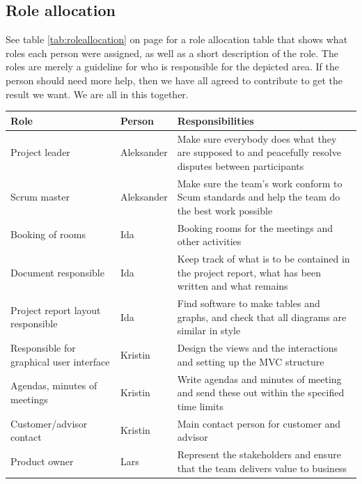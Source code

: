\subsection{Role allocation}
See table \ref{tab:roleallocation} on page \pageref{tab:roleallocation} for a role allocation table that shows what roles each person were assigned, as well as a short description of the role. The roles are merely a guideline for who is responsible for the depicted area. If the person should need more help, then we have all agreed to contribute to get the result we want. We are all in this together.
\begin{table}[hbt]
\begin{center}
\begin{tabularx}{\linewidth}{>{\setlength\hsize{.5\hsize}}X|>{\setlength\hsize{0.3\hsize}}X|>{\setlength\hsize{1\hsize}}X} \hline
\textbf{Role} & \textbf{Person} & \textbf{Responsibilities} \\ \hline \hline

Project leader & Aleksander & Make sure everybody does what they are supposed to and peacefully resolve disputes between participants \\  \hline
Scrum master & Aleksander & Make sure the team’s work conform to Scum standards and help the team do the best work possible \\ \hline

Booking of rooms & Ida & Booking rooms for the meetings and other activities \\ \hline
Document responsible & Ida &Keep track of what is to be contained in the project report, what has been written and what remains \\ \hline
Project report layout responsible & Ida &Find software to make tables and graphs, and check that all diagrams are similar in style \\ \hline

Responsible for graphical user interface & Kristin & Design the views and the interactions and setting up the MVC structure \\ \hline
Agendas, minutes of meetings & Kristin &Write agendas and minutes of meeting and send these out within the specified time limits \\ \hline
Customer/advisor contact & Kristin & Main contact person for customer and advisor \\ \hline

Product owner & Lars & Represent the stakeholders and ensure that the team delivers value to business\\ \hline


\end{tabularx}
\end{center}
\end{table}
